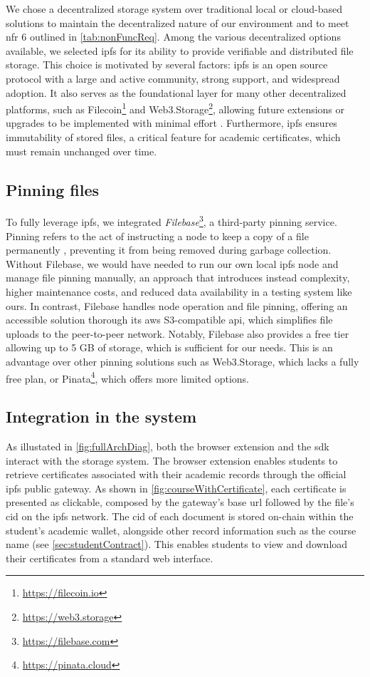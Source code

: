 We chose a decentralized storage system over traditional local or cloud-based solutions to maintain the decentralized nature of our environment and to meet \gls{nfr} 6 outlined in \cref{tab:nonFuncReq}. Among the various decentralized options available, we selected \gls{ipfs} for its ability to provide verifiable and distributed file storage. This choice is motivated by several factors: \gls{ipfs} is an open source protocol with a large and active community, strong support, and widespread adoption. It also serves as the foundational layer for many other decentralized platforms, such as Filecoin\footnote{\url{https://filecoin.io}} and Web3.Storage\footnote{\url{https://web3.storage}}, allowing future extensions or upgrades to be implemented with minimal effort \cite{erikflorian2022ipfsandfriends}. Furthermore, \gls{ipfs} ensures immutability of stored files, a critical feature for academic certificates, which must remain unchanged over time.

\subsection{Pinning files}
\label{ssec:pinningService}
To fully leverage \gls{ipfs}, we integrated \textit{Filebase}\footnote{\url{https://filebase.com}}, a third-party pinning service. Pinning refers to the act of instructing a node to keep a copy of a file permanently \cite{benet2014ipfscontentaddressed}, preventing it from being removed during garbage collection. Without Filebase, we would have needed to run our own local \gls{ipfs} node and manage file pinning manually, an approach that introduces instead complexity, higher maintenance costs, and reduced data availability in a testing system like ours. In contrast, Filebase handles node operation and file pinning, offering an accessible solution thorough its \gls{aws} S3-compatible \gls{api}, which simplifies file uploads to the peer-to-peer network. Notably, Filebase also provides a free tier allowing up to 5 GB of storage, which is sufficient for our needs. This is an advantage over other pinning solutions such as Web3.Storage, which lacks a fully free plan, or Pinata\footnote{\url{https://pinata.cloud}}, which offers more limited options.

\subsection{Integration in the system}
As illustated in \cref{fig:fullArchDiag}, both the browser extension and the \gls{sdk} interact with the storage system. The browser extension enables students to retrieve certificates associated with their academic records through the official \gls{ipfs} public gateway. As shown in \cref{fig:courseWithCertificate}, each certificate is presented as clickable, composed by the gateway's base \gls{url} followed by the file's \gls{cid} on the \gls{ipfs} network. The \gls{cid} of each document is stored on-chain within the student's academic wallet, alongside other record information such as the course name (see \cref{sec:studentContract}). This enables students to view and download their certificates from a standard web interface.


